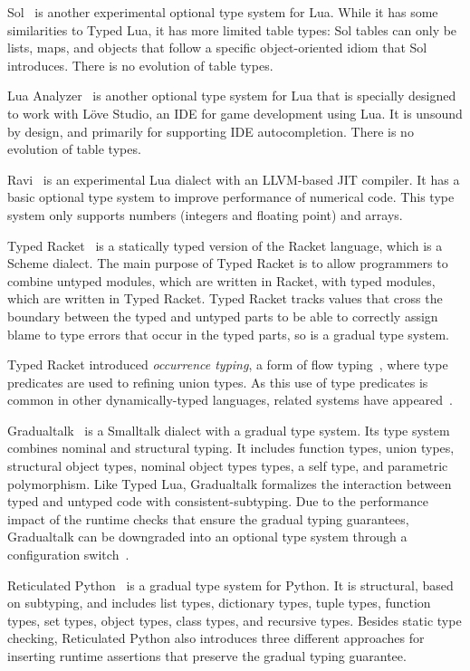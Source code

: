 \documentclass[preprint]{sigplanconf}
\begin{document}
Sol~\cite{sol} is another experimental optional type system
for Lua. While it has some similarities to Typed Lua, it
has more limited table types: Sol tables can only be lists,
maps, and objects that follow a specific object-oriented
idiom that Sol introduces. There is no evolution of table
types.

Lua Analyzer~\cite{luaanalyzer} is another optional type
system for Lua that is specially designed to work with
Löve Studio, an IDE for game development using Lua.
It is unsound by design, and primarily for supporting
IDE autocompletion. There is no evolution of table types.

Ravi~\cite{ravi} is an experimental Lua dialect
with an LLVM-based JIT compiler. It has a basic
optional type system to improve performance
of numerical code. This type system only supports
numbers (integers and floating point) and arrays.

Typed Racket~\cite{tobin-hochstadt2008ts} is a statically typed version of the Racket language, which is a Scheme dialect.
The main purpose of Typed Racket is to allow programmers to combine untyped modules, which are written in Racket, with typed modules, which are written in Typed Racket. Typed Racket tracks
values that cross the boundary between the typed and
untyped parts to be able to correctly assign blame to type
errors that occur in the typed parts, so is a gradual type
system.

Typed Racket introduced {\em occurrence typing}, a form of
flow typing~\cite{tobin-hochstadt2010ltu}, where type
predicates are used to refining union types.
As this use of type predicates is common in other
dynamically-typed languages, related systems
have appeared~\cite{guha2011tlc,winther2011gtp,pearce2013ccf}.

Gradualtalk~\cite{allende2013gts} is a Smalltalk dialect 
with a gradual type system. Its type system combines
nominal and structural typing.
It includes function types, union types, structural object types,
nominal object types types, a self type, and parametric polymorphism. Like Typed Lua, Gradualtalk formalizes the
interaction between typed and untyped code with consistent-subtyping. Due to the performance impact of
the runtime checks that ensure the gradual typing guarantees,
Gradualtalk can be downgraded into an optional type system
through a configuration switch~\cite{allende2013cis}.

Reticulated Python~\cite{vitousek2014deg} is a
gradual type system for Python. It is structural, based on subtyping, and includes list types,
dictionary types, tuple types, function types, set types,
object types, class types, and recursive types.
Besides static type checking, Reticulated Python also introduces
three different approaches for inserting runtime assertions
that preserve the gradual typing guarantee.
\end{document}
